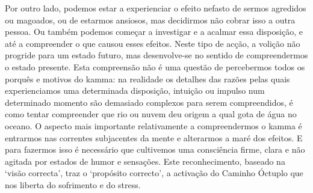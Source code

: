 Por outro lado, podemos estar a experienciar o efeito nefasto de sermos
agredidos ou magoados, ou de estarmos ansiosos, mas decidirmos não cobrar isso a
outra pessoa. Ou também podemos começar a investigar e a acalmar essa
disposição, e até a compreender o que causou esses efeitos. Neste tipo de acção,
a volição não progride para um estado futuro, mas desenvolve-se no sentido de
compreendermos o estado presente. Esta compreensão não é uma questão de
percebermos todos os porquês e motivos do kamma: na realidade os detalhes das
razões pelas quais experienciamos uma determinada disposição, intuição ou
impulso num determinado momento são demasiado complexos para serem
compreendidos, é como tentar compreender que rio ou nuvem deu origem a qual gota
de água no oceano.
O aspecto mais importante relativamente a compreendermos o kamma é
entrarmos nas correntes subjacentes da mente e alterarmos a maré dos efeitos. E
para fazermos isso é necessário que cultivemos uma consciência firme, clara e
não agitada por estados de humor e sensações. Este reconhecimento, baseado na
`visão correcta', traz o `propósito correcto', a activação do Caminho Óctuplo
que nos liberta do sofrimento e do stress.

